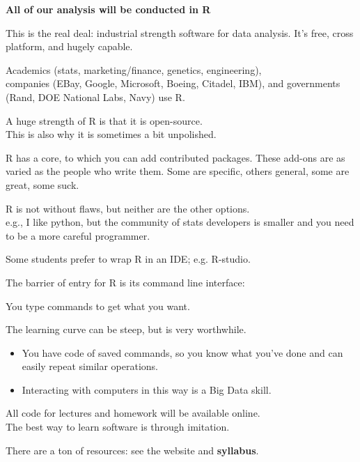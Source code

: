 \documentclass[11pt,xcolor=svgnames]{beamer}
\newcommand{\theme}{\color{Maroon}}
\newcommand{\gr}{\color{gray}}
\newcommand{\nv}{\color{Navy}}
\newcommand{\sk}{\vspace{.5cm}}
\begin{document}
\begin{frame}

{\bf All of our analysis will be conducted in \theme R} 

\sk
This is the real deal: industrial 
strength software for data analysis. It's free, cross
platform,  and hugely capable.

\sk 
Academics {\gr(stats, marketing/finance, genetics, engineering)}, \\ companies
{\gr(EBay, Google, Microsoft, Boeing, Citadel, IBM)}, and  governments
{\gr (Rand, DOE National Labs, Navy) } {\theme use R}.

\sk{
Since R is free, you'll always be able to use it.}

\end{frame}


\begin{frame}

{A huge strength of R is that it is open-source.}\\
{This is also why it is sometimes a bit unpolished.}

\sk
R has a {\nv core}, to which you can add contributed {\nv
  packages}.
{These add-ons are as varied as the people who write them.}
Some are specific, others general, some are great, some suck.

\sk
R is not without flaws, but neither are the other options.\\
{\gr e.g., I like python, but the community of stats developers is smaller and you need to be a more careful programmer. }


\sk 
Some students prefer to wrap R in an IDE; e.g. R-studio.
\end{frame}


\begin{frame}

The barrier of entry for R is its  command line  interface:

{\nv \hfill You type commands to get what you want.~~~~~~~~~~~~~~}

\sk
The learning curve can be steep, but is very worthwhile.
\begin{itemize}
\item You have code of saved commands, so you know what
  you've done and can easily repeat similar operations.
\item {\theme Interacting with computers in this way is a Big Data skill.}
\end{itemize}

\sk
All code for lectures and homework will be available
online.  \\{ The best way to learn software is through imitation. }

\sk There are a ton of resources: see the website and {\bf syllabus}.

\end{frame}
\end{document}
